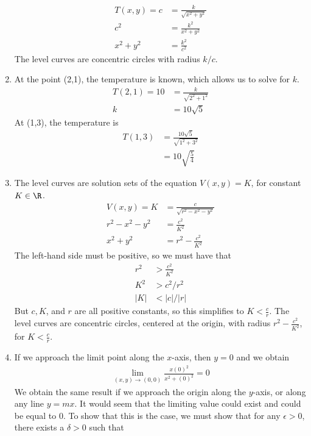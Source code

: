 \begin{enumerate}
\begin{align*}
  T(x,y) = c &= \frac{k}{\sqrt{x^2 + y^2}} \\
  c^2 &= \frac{k^2}{x^2 + y^2} \\
  x^2 + y^2 &= \frac{k^2}{c^2}
\end{align*} 
The level curves are concentric circles with radius $k/c$. 
\item At the point (2,1), the temperature is known, which allows us to solve for $k$. 
\begin{align*}
  T(2,1) = 10 &= \frac{k}{\sqrt{2^2 + 1^2}}\\
  k& = 10\sqrt{5}
\end{align*} 
At (1,3), the temperature is
\begin{align*}
  T(1,3) &= \frac{10\sqrt{5}}{\sqrt{1^2 + 3^2}}\\
  & = 10\sqrt{\frac{5}{4}}
\end{align*} 
\EEN
\item The level curves are solution sets of the equation $V(x,y) = K$, for constant $K\in\R$.
\begin{align*}
V(x,y) = K &= \frac{c}{\sqrt{r^2 - x^2 -y^2}} \\
r^2-x^2-y^2 &= \frac{c^2}{K^2} \\
x^2+y^2 &= r^2 -  \frac{c^2}{K^2}
\end{align*}
The left-hand side must be positive, so we must have that 
\begin{align*}
r^2 &>  \frac{c^2}{K^2}\\
K^2 &> c^2/r^2\\
 |K| &<  |c|/|r|
\end{align*}
But $c, K$, and $r$ are all positive constants, so this simplifies to $K<\frac{c}{r}$. The level curves are concentric circles, centered at the origin, with radius $r^2 -  \frac{c^2}{K^2}$, for $K<\frac{c}{r}$.
\item 
If we approach the limit point along the $x$-axis, then $y=0$ and we obtain
\begin{align*}
  \lim_{(x,y)\rightarrow(0,0) } \frac{x(0)^2}{x^2+(0)^2} = 0
\end{align*}
We obtain the same result if we approach the origin along the $y$-axis, or along any line $y=mx$. It would seem that the limiting value could exist and could be equal to 0. To show that this is the case, we must show that for any $\epsilon > 0$, there exists a $\delta > 0$ such that   

\end{enumerate}
